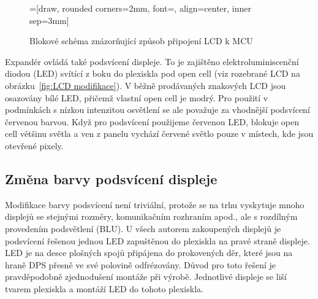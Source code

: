 \begin{figure}[htbp]
    \centering
    =[draw, rounded corners=2mm, font={\bfseries}, align=center, inner sep=3mm]
    \caption{Blokové schéma znázorňující způsob připojení LCD k MCU}
    \label{fig:LCD blok}
\end{figure}


Expandér ovládá také podsvícení displeje. To je zajištěno elektroluminiscenční
diodou (LED) svítící z boku do plexiskla pod open cell (viz rozebrané LCD na
obrázku~\vref{fig:LCD modifikace}). V běžně prodávaných znakových LCD jsou
osazovány bílé LED, přičemž vlastní open cell je modrý. Pro použití
v podmínkách s nízkou intenzitou osvětlení se ale považuje za vhodnější
podsvícení červenou barvou. Když pro
podsvícení použijeme červenou LED, blokuje open cell většinu světla a ven
z panelu vychází červené světlo pouze v místech, kde jsou otevřené pixely.

\subsection{Změna barvy podsvícení displeje}
Modifikace barvy podsvícení není triviální, protože se na trhu vyskytuje mnoho
displejů se stejnými rozměry, komunikačním rozhraním apod., ale s rozdílným
provedením podsvětlení (BLU). U všech autorem zakoupených displejů je
podsvícení řešenou jednou LED zapuštěnou do plexiskla na pravé straně displeje.
LED je na desce plošných spojů připájena do prokovených děr, které jsou na
hraně DPS přesně ve své polovině odfrézovány. Důvod pro toto řešení je
pravděpodobně zjednodušení montáže při výrobě. Jednotlivé displeje se liší
tvarem plexiskla a montáží LED do tohoto plexiskla.

